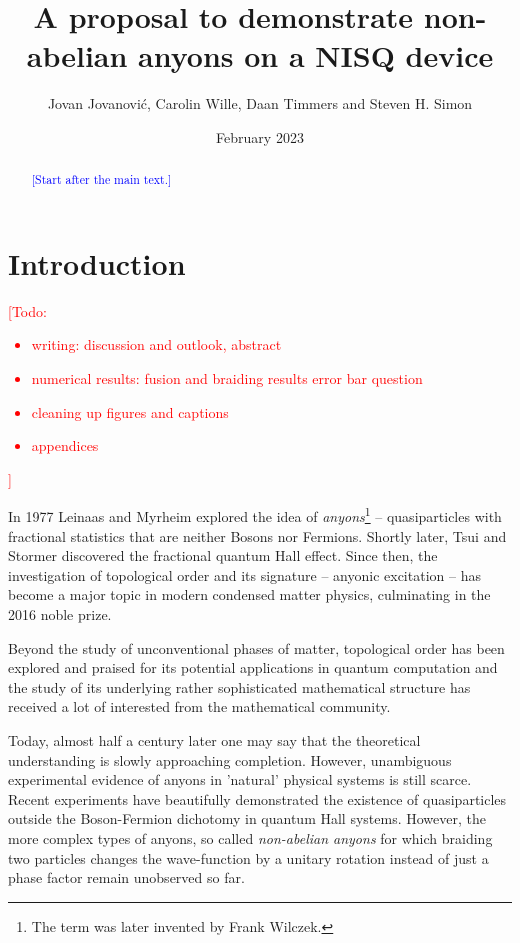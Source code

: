 \documentclass[two column]{article}
\title{A proposal to demonstrate non-abelian anyons on a NISQ device}
\author{Jovan Jovanovi\'c, Carolin Wille, Daan Timmers and Steven H. Simon}
\date{February 2023}
\newcommand{\caro}[1]{\textcolor{red}{[#1]}}
\newcommand{\jovan}[1]{\textcolor{blue}{[#1]}}
\begin{document}
\maketitle
\begin{abstract}
\jovan{Start after the main text.}
\end{abstract}
\tableofcontents



\section{Introduction}
\caro{Todo: \begin{itemize}
	\item writing: discussion and outlook, abstract
	\item numerical results: fusion and braiding results error bar question
	\item cleaning up figures and captions
	\item appendices
\end{itemize}
}

In 1977 Leinaas and Myrheim\cite{Leinaas1977OnTT} 
explored the idea of \emph{anyons}\footnote{The term was later invented by Frank Wilczek\cite{Wilczek}.} -- quasiparticles with fractional statistics that are neither Bosons nor Fermions. Shortly later, Tsui and Stormer\cite{Tsui} discovered the fractional quantum Hall effect. Since then, the investigation of topological order and its signature -- anyonic excitation -- has become a major topic in modern condensed matter physics, culminating in the 2016 noble prize\cite{nobel}. 


Beyond the study of unconventional phases of matter, topological order has been explored and praised for its potential applications in quantum computation\cite{Nayak} and the study of its underlying rather sophisticated mathematical structure\cite{Kitaev2006} has received a lot of interested from the mathematical community. 


Today, almost half a century later one may say that the theoretical understanding is slowly approaching completion. However, unambiguous experimental evidence of anyons in 'natural' physical systems is still scarce. Recent experiments have beautifully demonstrated the existence of quasiparticles outside the Boson-Fermion dichotomy in quantum Hall systems\cite{Nakamura_2020,Bartolomei}. However, the more complex types of anyons, so called \emph{non-abelian anyons} for which  braiding two particles changes the wave-function by a unitary rotation instead of just a phase factor remain unobserved so far.
\end{document}
